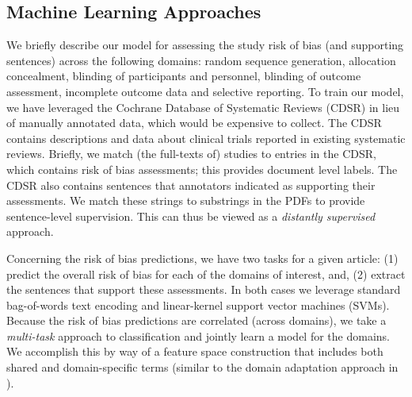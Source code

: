 \documentclass[runningheads,a4paper]{llncs}
\begin{document}

\subsection{Machine Learning Approaches}

We briefly describe our model for assessing the study risk of bias (and supporting sentences) across the following domains: random sequence generation, allocation concealment, blinding of participants and personnel, blinding of outcome assessment, incomplete outcome data and selective reporting. 
To train our model, we have leveraged the Cochrane Database of Systematic Reviews (CDSR) in lieu of manually annotated data, which would be expensive to collect. 
The CDSR contains descriptions and data about clinical trials reported in existing systematic reviews. 
Briefly, we match (the full-texts of) studies to entries in the CDSR, which contains risk of bias assessments; this provides document level labels. 
The CDSR also contains sentences that annotators indicated as supporting their assessments. 
We match these strings to substrings in the PDFs to provide sentence-level supervision. 
This can thus be viewed as a \emph{distantly supervised} \cite{mintz-09,nguyen-11} approach.

 
Concerning the risk of bias predictions, we have two tasks for a given article: (1) predict the overall risk of bias for each of the domains of interest, and, (2) extract the sentences that support these assessments. 
In both cases we leverage standard bag-of-words text encoding and linear-kernel support vector machines (SVMs). 
Because the risk of bias predictions are correlated (across domains), we take a \emph{multi-task} \cite{evgeniou2004} approach to classification and jointly learn a model for the domains. 
We accomplish this by way of a feature space construction that includes both shared and domain-specific terms (similar to the domain adaptation approach in \cite{daume2007}). 
\end{document}

